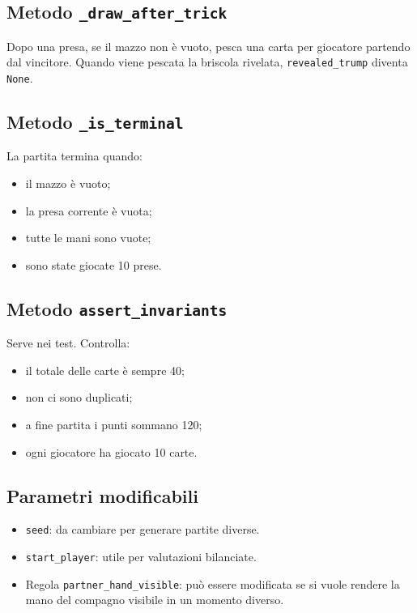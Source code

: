 \documentclass[11pt,a4paper]{article}
\begin{document}
\subsection{Metodo \texttt{\_draw\_after\_trick}}

Dopo una presa, se il mazzo non è vuoto, pesca una carta per giocatore partendo
dal vincitore. Quando viene pescata la briscola rivelata, \texttt{revealed\_trump}
diventa \texttt{None}.

\subsection{Metodo \texttt{\_is\_terminal}}

La partita termina quando:

\begin{itemize}
  \item il mazzo è vuoto;
  \item la presa corrente è vuota;
  \item tutte le mani sono vuote;
  \item sono state giocate 10 prese.
\end{itemize}

\subsection{Metodo \texttt{assert\_invariants}}

Serve nei test. Controlla:

\begin{itemize}
  \item il totale delle carte è sempre 40;
  \item non ci sono duplicati;
  \item a fine partita i punti sommano 120;
  \item ogni giocatore ha giocato 10 carte.
\end{itemize}

\subsection{Parametri modificabili}

\begin{itemize}
  \item \texttt{seed}: da cambiare per generare partite diverse.
  \item \texttt{start\_player}: utile per valutazioni bilanciate.
  \item Regola \texttt{partner\_hand\_visible}: può essere modificata se si vuole
  rendere la mano del compagno visibile in un momento diverso.
\end{itemize}
\end{document}
